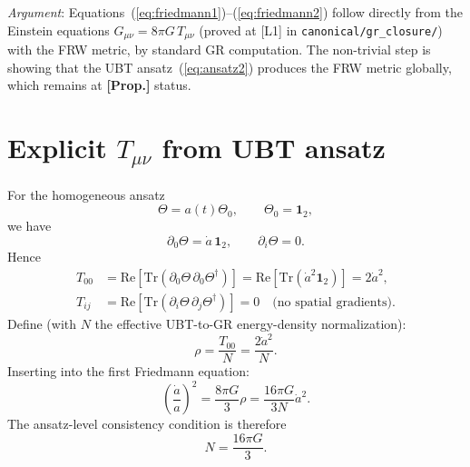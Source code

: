 \documentclass[12pt,a4paper]{article}
\begin{document}
\textit{Argument}: Equations~(\ref{eq:friedmann1})--(\ref{eq:friedmann2})
follow directly from the Einstein equations $G_{\mu\nu} = 8\pi G\,T_{\mu\nu}$
(proved at [L1] in \texttt{canonical/gr\_closure/}) with the FRW
metric, by standard GR computation.  The non-trivial step is showing that
the UBT ansatz~(\ref{eq:ansatz2}) produces the FRW metric globally, which
remains at \textbf{[Prop.]} status.

\section{Explicit $T_{\mu\nu}$ from UBT ansatz}
\label{sec:explicit_tmunu}

For the homogeneous ansatz
\[
\Theta=a(t)\Theta_0,\qquad \Theta_0=\mathbf{1}_2,
\]
we have
\[
\partial_0\Theta=\dot a\,\mathbf{1}_2,\qquad
\partial_i\Theta=0.
\]
Hence
\begin{align}
T_{00} &= \mathrm{Re}\!\left[\mathrm{Tr}\!\left(\partial_0\Theta\,
\partial_0\Theta^\dagger\right)\right]
= \mathrm{Re}\!\left[\mathrm{Tr}\!\left(\dot a^2\mathbf{1}_2\right)\right]
=2\dot a^2,\\
T_{ij} &= \mathrm{Re}\!\left[\mathrm{Tr}\!\left(\partial_i\Theta\,
\partial_j\Theta^\dagger\right)\right]=0
\quad\text{(no spatial gradients)}.
\end{align}
Define (with \(N\) the effective UBT-to-GR energy-density normalization):
\[
\rho=\frac{T_{00}}{N}=\frac{2\dot a^2}{N}.
\]
Inserting into the first Friedmann equation:
\[
\left(\frac{\dot a}{a}\right)^2=\frac{8\pi G}{3}\rho
=\frac{16\pi G}{3N}\dot a^2.
\]
The ansatz-level consistency condition is therefore
\[
N=\frac{16\pi G}{3}.
\]
\end{document}
